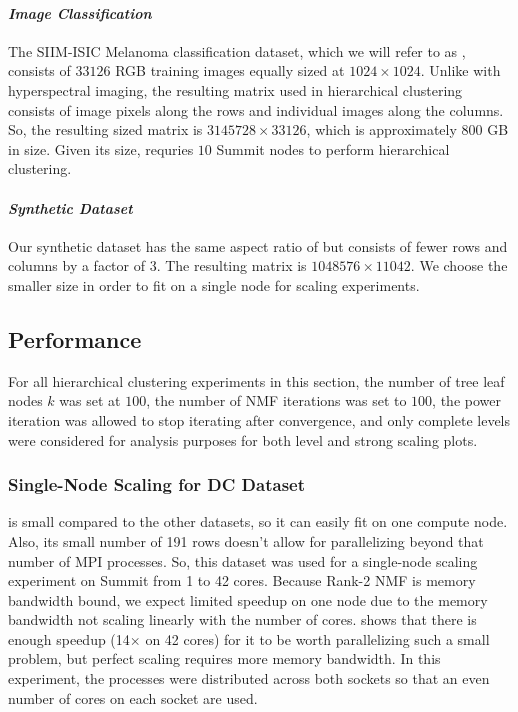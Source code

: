 	
\paragraph{\emph{Image Classification}}

	The SIIM-ISIC Melanoma classification
	dataset, which we will refer to as \image{}\cite{SIIM-ISIC}, consists of $33126$ RGB training images equally sized at $1024 \times 1024$. Unlike with hyperspectral imaging, the resulting
	matrix used in hierarchical clustering consists of image pixels along the rows and individual images along the columns. So, the resulting sized matrix is
	$3145728 \times 33126$, which is approximately 800 GB in size. 
	Given its size, \image{} requries $10$ Summit nodes to perform hierarchical clustering.
	
\paragraph{\emph{Synthetic Dataset}}

	Our synthetic dataset has the same aspect ratio of \image{} but consists of fewer rows and columns by a factor of $3$. The resulting matrix is $1048576 \times 11042$. 
	We choose the smaller size in order to fit on a single node for scaling experiments.

\subsection{Performance}
\label{sec:perf}
For all hierarchical clustering experiments in this section, the number of tree leaf nodes $k$ was set at $100$, 
the number of NMF iterations was set to $100$,
the power iteration was allowed to stop iterating after convergence,
and only complete levels were considered for analysis purposes for both level and strong scaling plots.

\subsubsection{Single-Node Scaling for DC Dataset}

\hyper{} is small compared to the other datasets, so it can easily fit on one compute node.
Also, its small number of 191 rows doesn't allow for parallelizing beyond that number of MPI processes.
So, this dataset was used for a single-node scaling experiment on Summit from 1 to 42 cores.
Because Rank-2 NMF is memory bandwidth bound, we expect limited speedup on one node due to the memory bandwidth not scaling linearly with the number of cores. 
 shows that there is enough speedup (14$\times$ on 42 cores) for it to be worth parallelizing such a small problem, but perfect scaling requires more memory bandwidth. 
In this experiment, the processes were distributed across both sockets so that an even number of cores on each socket are used.

